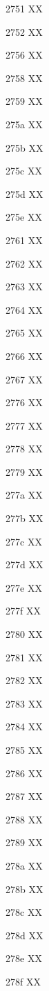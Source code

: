 \documentclass[11pt]{article}
\begin{document}
2751 X{}X

2752 X{}X

2756 X{}X

2758 X{}X

2759 X{}X

275a X{}X

275b X{}X

275c X{}X

275d X{}X

275e X{}X

2761 X{}X

2762 X{}X

2763 X{}X

2764 X{}X

2765 X{}X

2766 X{}X

2767 X{}X

2776 X{}X

2777 X{}X

2778 X{}X

2779 X{}X

277a X{}X

277b X{}X

277c X{}X

277d X{}X

277e X{}X

277f X{}X

2780 X{}X

2781 X{}X

2782 X{}X

2783 X{}X

2784 X{}X

2785 X{}X

2786 X{}X

2787 X{}X

2788 X{}X

2789 X{}X

278a X{}X

278b X{}X

278c X{}X

278d X{}X

278e X{}X

278f X{}X
\end{document}
